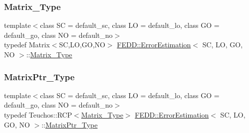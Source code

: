 \mbox{\label{classFEDD_1_1ErrorEstimation_a4c4fef6ebb4e98048a10b84069371e80}} 
\subsubsection{\texorpdfstring{Matrix\+\_\+\+Type}{Matrix\_Type}}
{\footnotesize\ttfamily template$<$class SC = default\+\_\+sc, class LO = default\+\_\+lo, class GO = default\+\_\+go, class NO = default\+\_\+no$>$ \\
typedef Matrix$<$SC,LO,GO,NO$>$ \hyperlink{classFEDD_1_1ErrorEstimation}{F\+E\+D\+D\+::\+Error\+Estimation}$<$ SC, LO, GO, NO $>$\+::\hyperlink{classFEDD_1_1ErrorEstimation_a4c4fef6ebb4e98048a10b84069371e80}{Matrix\+\_\+\+Type}}

\mbox{\label{classFEDD_1_1ErrorEstimation_a087074cb92827fb21dac83cb1644c244}} 
\subsubsection{\texorpdfstring{Matrix\+Ptr\+\_\+\+Type}{MatrixPtr\_Type}}
{\footnotesize\ttfamily template$<$class SC = default\+\_\+sc, class LO = default\+\_\+lo, class GO = default\+\_\+go, class NO = default\+\_\+no$>$ \\
typedef Teuchos\+::\+R\+CP$<$\hyperlink{classFEDD_1_1ErrorEstimation_a4c4fef6ebb4e98048a10b84069371e80}{Matrix\+\_\+\+Type}$>$ \hyperlink{classFEDD_1_1ErrorEstimation}{F\+E\+D\+D\+::\+Error\+Estimation}$<$ SC, LO, GO, NO $>$\+::\hyperlink{classFEDD_1_1ErrorEstimation_a087074cb92827fb21dac83cb1644c244}{Matrix\+Ptr\+\_\+\+Type}}

\mbox{\label{classFEDD_1_1ErrorEstimation_a6e55e8a488e7f9db2325d530dfacada5}} 
